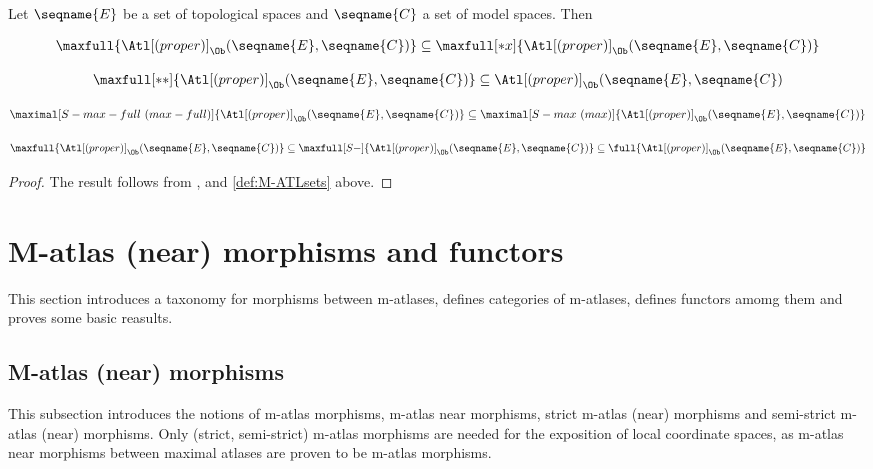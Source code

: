 \documentclass{article}
\begin{document}
\begin{corollary}
\label{cor:M-ATLsets}

Let $\seqname{E}$ be a set of topological spaces and $\seqname{C}$ a
set of model spaces. Then

\begin{equation}
  \maxfull{\Atl[(proper)]_\Ob(\seqname{E}, \seqname{C})} \subseteq
  \maxfull[*x]{\Atl[(proper)]_\Ob(\seqname{E}, \seqname{C})}
\end{equation}

\begin{equation}
  \maxfull[**]{\Atl[(proper)]_\Ob(\seqname{E}, \seqname{C})} \subseteq
  \Atl[(proper)]_\Ob(\seqname{E}, \seqname{C})
\end{equation}

\begin{equation}
  \maximal[S-max-full~(max-full)]{\Atl[(proper)]_\Ob(\seqname{E}, \seqname{C})}
  \subseteq
  \maximal[S-max~(max)]{\Atl[(proper)]_\Ob(\seqname{E}, \seqname{C})}
\end{equation}

\begin{equation}
  \maxfull{\Atl[(proper)]_\Ob(\seqname{E}, \seqname{C})} \subseteq
  \maxfull[S-]{\Atl[(proper)]_\Ob(\seqname{E}, \seqname{C})} \subseteq
  \full{\Atl[(proper)]_\Ob(\seqname{E}, \seqname{C})}
\end{equation}

\begin{proof}
The result follows from ,  
and \cref{def:M-ATLsets} above.
\end{proof}
\end{corollary}

\section{M-atlas (near) morphisms and functors}
\label{sec:M-ATLmorph}
This section introduces a taxonomy for morphisms between m-atlases,
defines categories of m-atlases, defines functors amomg them and proves
some basic reasults.

\subsection{M-atlas (near) morphisms}
\label{sub:M-ATLmorph}
This subsection introduces the notions of m-atlas morphisms, m-atlas
near morphisms, strict m-atlas (near) morphisms and semi-strict m-atlas
(near) morphisms. Only (strict, semi-strict) m-atlas morphisms are
needed for the exposition of local coordinate spaces, as m-atlas near
morphisms between maximal atlases are proven to be m-atlas morphisms.
\end{document}
